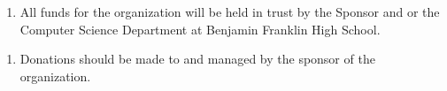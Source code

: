 
\begin{enumerate}
	\item All funds for the organization will be held in trust by the Sponsor and or
		the Computer Science Department at Benjamin Franklin High School.
\end{enumerate}

\begin{enumerate}
	\item Donations should be made to and managed by the sponsor of the organization.
\end{enumerate}